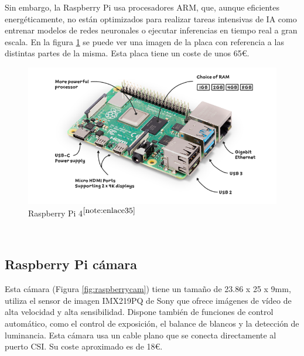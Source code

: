  Sin embargo, la Raspberry Pi usa procesadores ARM, que, aunque eficientes energéticamente, no están optimizados para realizar tareas intensivas de \ac{IA} como entrenar modelos de redes neuronales o ejecutar inferencias en tiempo real a gran escala. En la figura \ref{fig:raspberry} se puede ver una imagen de la placa con referencia a las distintas partes de la misma. Esta placa tiene un coste de unos 65€. 


\begin{figure} [h!]
	\begin{center}
		\includegraphics[width=14cm]{figs/raspberrypi4.png}
	\end{center}
	\caption{Raspberry Pi 4$^{\ref{note:enlace35}}$} 
\label{fig:raspberry}
\end{figure}\

\setcounter{footnote}{35} %

\subsection{Raspberry Pi cámara}

Esta cámara (Figura \ref{fig:raspberrycam}) tiene un tamaño de  23.86 x 25 x 9mm, utiliza el sensor de imagen IMX219PQ de Sony que ofrece imágenes de vídeo de alta velocidad y alta sensibilidad. Dispone también de funciones de control automático, como el control de exposición, el balance de blancos y la detección de luminancia. Esta cámara usa un cable plano que se conecta directamente al puerto \ac{CSI}. Su coste aproximado es de 18€. 



